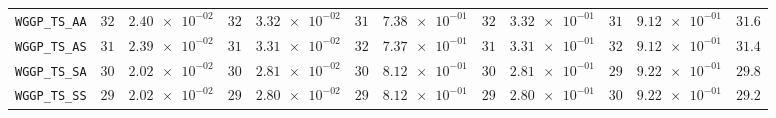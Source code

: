 \begin{xltabular}{\textwidth}{l||cC|cC|cC|cC|cC||c}
	\texttt{WGGP\_TS\_AA} & $ 32$ & $ \num{2.40e-02}$ & $ 32$ & $ \num{3.32e-02}$ & $ 31$ & $ \num{7.38e-01}$ & $ 32$ & $ \num{3.32e-01}$ & $ 31$ & $ \num{9.12e-01}$ & $ 31.6$  \\
	\texttt{WGGP\_TS\_AS} & $ 31$ & $ \num{2.39e-02}$ & $ 31$ & $ \num{3.31e-02}$ & $ 32$ & $ \num{7.37e-01}$ & $ 31$ & $ \num{3.31e-01}$ & $ 32$ & $ \num{9.12e-01}$ & $ 31.4$  \\
	\texttt{WGGP\_TS\_SA} & $ 30$ & $ \num{2.02e-02}$ & $ 30$ & $ \num{2.81e-02}$ & $ 30$ & $ \num{8.12e-01}$ & $ 30$ & $ \num{2.81e-01}$ & $ 29$ & $ \num{9.22e-01}$ & $ 29.8$  \\
	\texttt{WGGP\_TS\_SS} & $ 29$ & $ \num{2.02e-02}$ & $ 29$ & $ \num{2.80e-02}$ & $ 29$ & $ \num{8.12e-01}$ & $ 29$ & $ \num{2.80e-01}$ & $ 30$ & $ \num{9.22e-01}$ & $ 29.2$  \\
\end{xltabular}
